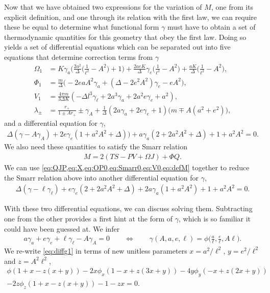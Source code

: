 \documentclass[
twoside,
openright,
frontopenright,
]{dmathesis}
\newcommand{\nn}{\nonumber}
\begin{document}
Now that we have obtained two expressions for the variation of $M$, one from its
explicit definition, and one through its relation with the first law, we can
require these be equal to determine what functional form $\gamma$ must have to
obtain a set of thermodynamic quantities for this geometry that obey the first
law.  Doing so yields a set of differential equations which can be separated out
into five equations that determine correction terms from $\gamma$
\begin{align}
\Omega_1 &= K \gamma_{a} \bigg(\frac{2 a^2}{\Delta} \Big(\frac{1}{\ell^2}-A^2\Big)+1\bigg) + \frac{2 a e K}{\Delta}\gamma_{e} \Big(\frac{1}{\ell^2}-A^2\Big)+\frac{a K}{\Delta} \Big(\frac{1}{\ell^2}-A^2 \Big),\nn\\
\Phi_1 &= \frac{m}{\Delta}\Big(-2 e a A^2\gamma_{a}+(\Delta-2 e^2 A^2)\gamma_{e}-eA^2\Big) ,\nn\\
V_1 &= \frac{4 \pi  m }{3 \Delta K}(-\Delta l^3 \gamma_{\ell}+2 a^3 \gamma_{a}+2 a^2 e \gamma_{e}+a^2),\nn\\
\lambda_\pm &= \frac{r_+}{1\pm Ar_+}\pm \gamma_{A} + \frac{1}{\Delta}(2a\gamma_{a} + 2e \gamma_{e} + 1)\big(m\mp A(a^2+e^2)\big) ,
\label{eq:corrTermsWithGamma}
\end{align}
and a differential equation for $\gamma$, 
\begin{align}\label{eq:diffg1}
\Delta(\gamma-A\gamma_{A})+2e\gamma_{e}(1+a^2A^2+\Delta))+a\gamma_{a}(2+2a^2A^2+\Delta)+1+a^2A^2=0.
\end{align}
We also need these quantities to satisfy the Smarr relation
\begin{align}
M=2(TS-PV+\Omega J) + \Phi Q.
\end{align}
We can use \cref{eq:QJP,eq:X,eq:OP0,eq:Smarr0,eq:V0,eq:defM} together to reduce
the Smarr relation above into another differential equation for $\gamma$, 
\begin{align}\label{eq:diffg2}
\Delta(\gamma - \ell\gamma_{\ell}) + e\gamma_{e}(2+2a^2A^2+\Delta)+2a\gamma_{a}(1+a^2A^2)+1+a^2A^2 = 0.
\end{align}

With these two differential equations, we can discuss solving them. Subtracting
one from the other provides a first hint at the form of $\gamma$, which is so
familiar it could have been guessed at. We infer 
\begin{align}
a\gamma_{a} + e\gamma_{e} + \ell\gamma_{\ell} - A \gamma_{A} = 0 \qquad \Longleftrightarrow \qquad \gamma(A,a,e,\ell) = \phi\Big(\frac{a}{\ell}, \frac{e}{\ell}, A\ell\Big).
\end{align}
We re-write \cref{eq:diffg1} in terms of new unitless parameters $x=
a^2/\ell^2$, $y=e^2/\ell^2$ and $z=A^2\ell^2$, 
\begin{multline}
\phi(1+x-z(x+y))-2x \phi_{x}(1-x+z(3x+y))-4y\phi_{y}(-x+z(2x+y))\\-2z\phi_{z}(1+x-z(x+y))-1-zx=0.
\end{multline}
\end{document}
